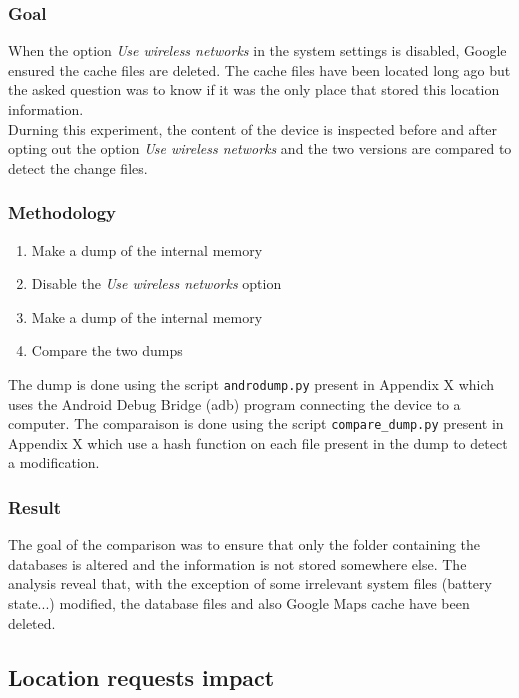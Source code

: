 \subsubsection{Goal}

When the option \emph{Use wireless networks} in the system settings is disabled, Google ensured the cache files are deleted.
The cache files have been located long ago but the asked question was to know if it was the only place that stored this location information.\\

Durning this experiment, the content of the device is inspected before and after opting out the option \emph{Use wireless networks} and the two versions are compared to detect the change files.

\subsubsection{Methodology}

\begin{enumerate}
\item Make a dump of the internal memory
\item Disable the \emph{Use wireless networks} option
\item Make a dump of the internal memory
\item Compare the two dumps
\end{enumerate}

The dump is done using the script \texttt{androdump.py} present in Appendix X which uses the Android Debug Bridge (adb) program connecting the device to a computer.
The comparaison is done using the script \texttt{compare_dump.py} present in Appendix X which use a hash function on each file present in the dump to detect a modification.

\subsubsection{Result}

The goal of the comparison was to ensure that only the folder containing the databases is altered and the information is not stored somewhere else.
The analysis reveal that, with the exception of some irrelevant system files (battery state...) modified, the database files and also Google Maps cache have been deleted.\\

\subsection{Location requests impact}

